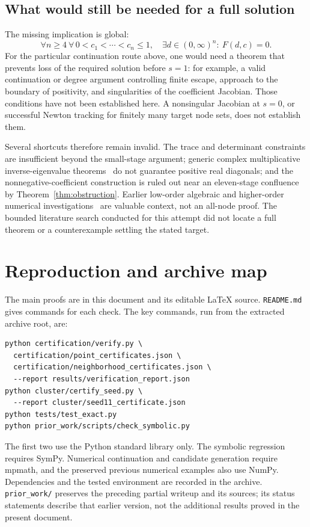 \documentclass[11pt]{article}
\theoremstyle{remark}\newtheorem{remark}[theorem]{Remark}
\begin{document}
\subsection{What would still be needed for a full solution}
The missing implication is global:
\[
 \forall n\ge4\ \forall\,0<c_1<\cdots<c_n\le1,
 \quad\exists d\in(0,\infty)^n:\ F(d,c)=0.
\]
For the particular continuation route above, one would need a theorem that
prevents loss of the required solution before $s=1$: for example, a valid
continuation or degree argument controlling finite escape, approach to the
boundary of positivity, and singularities of the coefficient Jacobian.
Those conditions have not been established here. A nonsingular Jacobian at
$s=0$, or successful Newton tracking for finitely many target node sets,
does not establish them.

Several shortcuts therefore remain invalid. The trace and determinant
constraints are insufficient beyond the small-stage argument; generic
complex multiplicative inverse-eigenvalue theorems~\cite{rosenthal} do not
guarantee positive real diagonals; and the nonnegative-coefficient
construction is ruled out near an eleven-stage confluence by
Theorem~\ref{thm:obstruction}. Earlier low-order algebraic and higher-order
numerical investigations~\cite{lioen} are valuable context, not an all-node
proof. The bounded literature search conducted for this attempt did not
locate a full theorem or a counterexample settling the stated target.

\section{Reproduction and archive map}
The main proofs are in this document and its editable LaTeX source.
\texttt{README.md} gives commands for each check. The key commands, run from
the extracted archive root, are:
\begin{verbatim}
python certification/verify.py \
  certification/point_certificates.json \
  certification/neighborhood_certificates.json \
  --report results/verification_report.json
python cluster/certify_seed.py \
  --report cluster/seed11_certificate.json
python tests/test_exact.py
python prior_work/scripts/check_symbolic.py
\end{verbatim}
The first two use the Python standard library only. The symbolic regression
requires SymPy. Numerical continuation and candidate generation require
mpmath, and the preserved previous numerical examples also use NumPy.
Dependencies and the tested environment are recorded in the archive.
\texttt{prior\_work/} preserves the preceding partial writeup and its sources;
its status statements describe that earlier version, not the additional
results proved in the present document.
\end{document}
